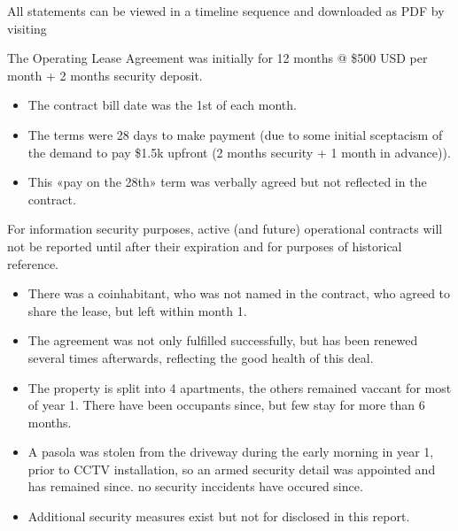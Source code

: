 \documentclass[letterpaper,10pt,openany,oneside,russian]{sphinxmanual}
\begin{document}
\sphinxAtStartPar
All statements can be viewed in a timeline sequence and downloaded as PDF by visiting {\hyperref[\detokenize{annex:lease-statements-annex}]{}}

\sphinxAtStartPar
The Operating Lease Agreement was initially for 12 months @ \$500 USD per month + 2 months security deposit.
\begin{itemize}
\item {} 
\sphinxAtStartPar
The contract bill date was the 1st of each month.

\item {} 
\sphinxAtStartPar
The terms were 28 days to make payment (due to some initial sceptacism of the demand to pay \$1.5k upfront (2 months security + 1 month in advance)).

\item {} 
\sphinxAtStartPar
This «pay on the 28th» term was verbally agreed but not reflected in the contract.

\end{itemize}

\sphinxAtStartPar
For information security purposes, active (and future) operational contracts will not be reported until after their expiration and for purposes of historical reference.

\sphinxAtStartPar
{}
\begin{itemize}
\item {} 
\sphinxAtStartPar
There was a co\sphinxhyphen{}inhabitant, who was not named in the contract, who agreed to share the lease, but left within month 1.

\item {} 
\sphinxAtStartPar
The agreement was not only fulfilled successfully, but has been renewed several times afterwards, reflecting the good health of this deal.

\item {} 
\sphinxAtStartPar
The property is split into 4 apartments, the others remained vaccant for most of year 1. There have been occupants since, but few stay for more than 6 months.

\item {} 
\sphinxAtStartPar
A pasola was stolen from the driveway during the early morning in year 1, prior to CCTV installation, so an armed security detail was appointed and has remained since. no security inccidents have occured since.

\item {} 
\sphinxAtStartPar
Additional security measures exist but not for disclosed in this report.

\end{itemize}
\end{document}
